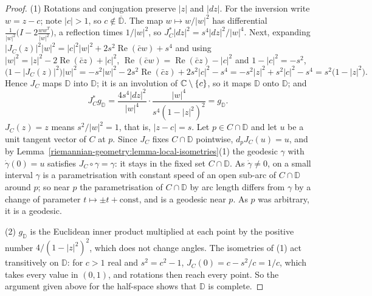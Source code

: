 \begin{proof}
(1) Rotations and conjugation preserve $|z|$ and $|dz|$. For the inversion write $w = z - c$; note $|c| > 1$, so $c \notin \overline{\mathbb{D}}$. The map $w \mapsto w/|w|^2$ has differential
$\frac{1}{|w|^2}\bigl(I - 2\frac{ww^T}{|w|^2}\bigr)$, a reflection times $1/|w|^2$, so $J_C^*|dz|^2 = s^4|dz|^2/|w|^4$. Next, expanding $|J_C(z)|^2|w|^2 = |c|^2|w|^2 + 2s^2\operatorname{Re}(\bar cw) + s^4$ and
using $|w|^2 = |z|^2 - 2\operatorname{Re}(\bar cz) + |c|^2$, $\operatorname{Re}(\bar cw) = \operatorname{Re}(\bar cz) - |c|^2$ and $1 - |c|^2 = -s^2$,
\[
\bigl(1 - |J_C(z)|^2\bigr)|w|^2 = -s^2|w|^2 - 2s^2\operatorname{Re}(\bar cz) + 2s^2|c|^2 - s^4 = -s^2|z|^2 + s^2|c|^2 - s^4 = s^2\bigl(1 - |z|^2\bigr).
\]
Hence $J_C$ maps $\mathbb{D}$ into $\mathbb{D}$; it is an involution of $\mathbb{C} \setminus \{c\}$, so it maps $\mathbb{D}$ onto $\mathbb{D}$; and
\[
J_C^*g_{\mathbb{D}} = \frac{4s^4|dz|^2}{|w|^4} \cdot \frac{|w|^4}{s^4(1 - |z|^2)^2} = g_{\mathbb{D}} .
\]
$J_C(z) = z$ means $s^2/|w|^2 = 1$, that is, $|z - c| = s$. Let $p \in C \cap \mathbb{D}$ and let $u$ be a unit tangent vector of $C$ at $p$. Since $J_C$ fixes $C \cap \mathbb{D}$ pointwise, $d_pJ_C(u) = u$,
and by Lemma~\ref{riemannian-geometry:lemma-local-isometries}(1) the geodesic $\gamma$ with $\dot\gamma(0) = u$ satisfies $J_C \circ \gamma = \gamma$: it stays in the fixed set $C \cap \mathbb{D}$. As
$\dot\gamma \neq 0$, on a small interval $\gamma$ is a parametrisation with constant speed of an open sub-arc of $C \cap \mathbb{D}$ around $p$; so near $p$ the parametrisation of $C \cap \mathbb{D}$ by
arc length differs from $\gamma$ by a change of parameter $t \mapsto \pm t + \mathrm{const}$, and is a geodesic near $p$. As $p$ was arbitrary, it is a geodesic.

(2) $g_{\mathbb{D}}$ is the Euclidean inner product multiplied at each point by the positive number $4/(1 - |z|^2)^2$, which does not change angles. The isometries of (1) act transitively on
$\mathbb{D}$: for $c > 1$ real and $s^2 = c^2 - 1$, $J_C(0) = c - s^2/c = 1/c$, which takes every value in $(0, 1)$, and rotations then reach every point. So the argument given above for the half-space
shows that $\mathbb{D}$ is complete.


\end{proof}
